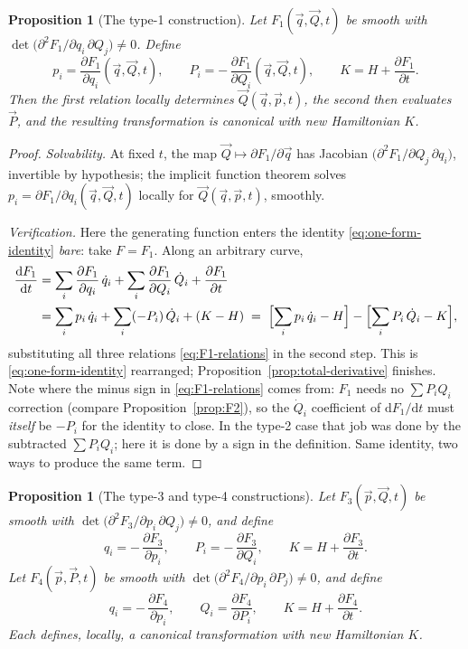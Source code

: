 \documentclass[11pt]{article}
\theoremstyle{plain}
\newtheorem{proposition}[theorem]{Proposition}
\theoremstyle{definition}
\theoremstyle{remark}
\newcommand{\dd}{\mathrm{d}}
\newcommand{\pd}[2]{\frac{\partial #1}{\partial #2}}
\newcommand{\tot}[2]{\frac{\dd #1}{\dd #2}}
\newcommand{\vq}{\vec{q}}
\newcommand{\vp}{\vec{p}}
\newcommand{\vQ}{\vec{Q}}
\newcommand{\vP}{\vec{P}}
\begin{document}
\begin{proposition}[The type-1 construction]
\label{prop:F1}
Let $F_1(\vq, \vQ, t)$ be smooth with
$\det\bigl(\partial^2 F_1/\partial q_i\,\partial Q_j\bigr) \ne 0$.
Define
\begin{equation}
  p_i = \pd{F_1}{q_i}(\vq, \vQ, t),
  \qquad
  P_i = -\,\pd{F_1}{Q_i}(\vq, \vQ, t),
  \qquad
  K = H + \pd{F_1}{t} .
  \label{eq:F1-relations}
\end{equation}
Then the first relation locally determines $\vQ(\vq, \vp, t)$, the
second then evaluates $\vP$, and the resulting transformation is
canonical with new Hamiltonian $K$.
\end{proposition}

\begin{proof}
\emph{Solvability.} At fixed $t$, the map
$\vQ \mapsto \partial F_1/\partial\vq$ has Jacobian
$\bigl(\partial^2 F_1/\partial Q_j\,\partial q_i\bigr)$, invertible by
hypothesis; the implicit function theorem solves
$p_i = \partial F_1/\partial q_i(\vq, \vQ, t)$ locally for
$\vQ(\vq, \vp, t)$, smoothly.

\emph{Verification.} Here the generating function enters the identity
\eqref{eq:one-form-identity} \emph{bare}: take $F = F_1$. Along an
arbitrary curve,
\begin{align}
  \tot{F_1}{t}
  &= \sum_i \pd{F_1}{q_i}\,\dot q_i
   + \sum_i \pd{F_1}{Q_i}\,\dot Q_i
   + \pd{F_1}{t} \nonumber\\
  &= \sum_i p_i\,\dot q_i
   + \sum_i (-P_i)\,\dot Q_i
   + (K - H)
  \;=\;
  \Bigl[\sum_i p_i\,\dot q_i - H\Bigr]
  - \Bigl[\sum_i P_i\,\dot Q_i - K\Bigr] ,
\end{align}
substituting all three relations \eqref{eq:F1-relations} in the second
step. This is \eqref{eq:one-form-identity} rearranged;
Proposition~\ref{prop:total-derivative} finishes. Note where the minus
sign in \eqref{eq:F1-relations} comes from: $F_1$ needs no
$\sum P_i Q_i$ correction (compare Proposition~\ref{prop:F2}), so the
$\dot Q_i$ coefficient of $\dd F_1/\dd t$ must \emph{itself} be
$-P_i$ for the identity to close. In the type-2 case that job was done
by the subtracted $\sum P_i Q_i$; here it is done by a sign in the
definition. Same identity, two ways to produce the same term.
\end{proof}

\begin{proposition}[The type-3 and type-4 constructions]
\label{prop:F34}
Let $F_3(\vp, \vQ, t)$ be smooth with
$\det\bigl(\partial^2 F_3/\partial p_i\,\partial Q_j\bigr) \ne 0$, and
define
\begin{equation}
  q_i = -\,\pd{F_3}{p_i},
  \qquad
  P_i = -\,\pd{F_3}{Q_i},
  \qquad
  K = H + \pd{F_3}{t} .
  \label{eq:F3-relations}
\end{equation}
Let $F_4(\vp, \vP, t)$ be smooth with
$\det\bigl(\partial^2 F_4/\partial p_i\,\partial P_j\bigr) \ne 0$, and
define
\begin{equation}
  q_i = -\,\pd{F_4}{p_i},
  \qquad
  Q_i = \pd{F_4}{P_i},
  \qquad
  K = H + \pd{F_4}{t} .
  \label{eq:F4-relations}
\end{equation}
Each defines, locally, a canonical transformation with new
Hamiltonian $K$.
\end{proposition}
\end{document}
